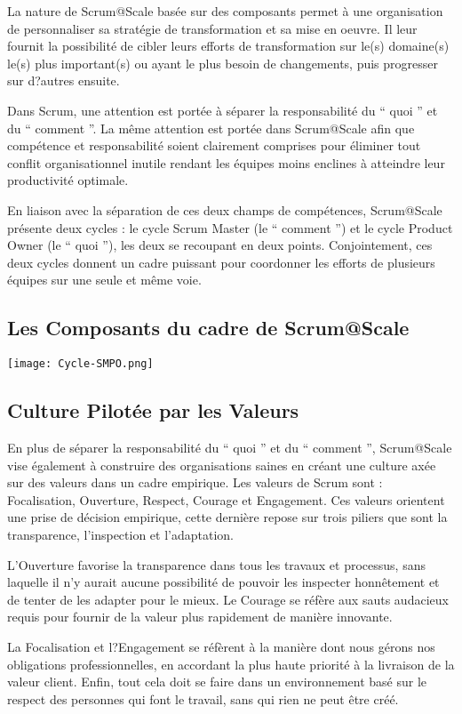 \documentclass[12pt,a4paper,parskip=full]{scrartcl}
\begin{document}
La nature de Scrum@Scale basée sur des composants permet à une organisation de
personnaliser sa stratégie de transformation et sa mise en oeuvre. Il leur fournit la
possibilité de cibler leurs efforts de transformation sur le(s) domaine(s) le(s) plus
important(s) ou ayant le plus besoin de changements, puis progresser sur d?autres
ensuite.

Dans Scrum, une attention est portée à séparer la responsabilité du `` quoi '' et du
`` comment ''. La même attention est portée dans Scrum@Scale afin que compétence et
responsabilité soient clairement comprises pour éliminer tout conflit organisationnel inutile
rendant les équipes moins enclines à atteindre leur productivité optimale.

En liaison avec la séparation de ces deux champs de compétences, Scrum@Scale
présente deux cycles : le cycle Scrum Master (le `` comment '') et le cycle Product Owner
(le `` quoi ''), les deux se recoupant en deux points. Conjointement, ces deux cycles
donnent un cadre puissant pour coordonner les efforts de plusieurs équipes sur une seule
et même voie.

\subsection{Les Composants du cadre de Scrum@Scale\textregistered}

\texttt{[image: Cycle-SMPO.png]}

\subsection{Culture Pilotée par les Valeurs}
En plus de séparer la responsabilité du `` quoi '' et du `` comment '', Scrum@Scale vise
également à construire des organisations saines en créant une culture axée sur des
valeurs dans un cadre empirique. Les valeurs de Scrum sont : Focalisation, Ouverture,
Respect, Courage et Engagement. Ces valeurs orientent une prise de décision empirique,
cette dernière repose sur trois piliers que sont la transparence, l'inspection et l'adaptation.

L'Ouverture favorise la transparence dans tous les travaux et processus, sans laquelle il
n'y aurait aucune possibilité de pouvoir les inspecter honnêtement et de tenter de les
adapter pour le mieux. Le Courage se réfère aux sauts audacieux requis pour fournir de la
valeur plus rapidement de manière innovante.

La Focalisation et l?Engagement se réfèrent à la manière dont nous gérons nos obligations
professionnelles, en accordant la plus haute priorité à la livraison de la valeur client. Enfin,
tout cela doit se faire dans un environnement basé sur le respect des personnes qui font le
travail, sans qui rien ne peut être créé.
\end{document}
